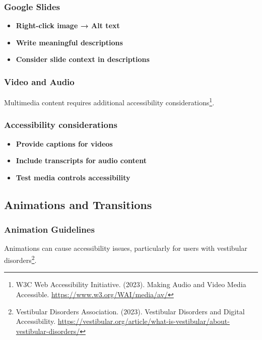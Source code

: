 \subsubsection{Google Slides}
\vspace{1em}
\begin{itemize}
\item \textbf{Right-click image → Alt text}
\item \textbf{Write meaningful descriptions}
\item \textbf{Consider slide context in descriptions}
\end{itemize}
\vspace{1em}

\subsubsection{Video and Audio}
Multimedia content requires additional accessibility considerations\footnote{W3C Web Accessibility Initiative. (2023). Making Audio and Video Media Accessible. \url{https://www.w3.org/WAI/media/av/}}.

\subsubsection{Accessibility considerations}
\vspace{1em}
\begin{itemize}
\item \textbf{Provide captions for videos}
\item \textbf{Include transcripts for audio content}
\item \textbf{Test media controls accessibility}
\end{itemize}
\vspace{1em}

\subsection{Animations and Transitions}

\subsubsection{Animation Guidelines}
Animations can cause accessibility issues, particularly for users with vestibular disorders\footnote{Vestibular Disorders Association. (2023). Vestibular Disorders and Digital Accessibility. \url{https://vestibular.org/article/what-is-vestibular/about-vestibular-disorders/}}.

